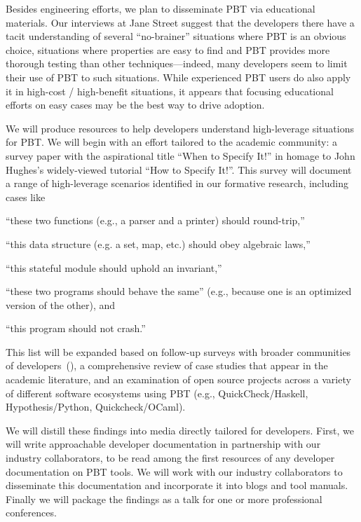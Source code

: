 %
Besides engineering efforts, we plan to disseminate PBT via
educational materials.
Our interviews at Jane Street suggest that the developers there
have a tacit
understanding of several ``no-brainer'' situations where PBT is an obvious
choice, situations where properties are easy to find and PBT provides
more thorough testing than other techniques---indeed, many developers
seem to limit their use of PBT to such situations.
While experienced PBT users do also apply it in
high-cost / high-benefit situations, it appears that
focusing educational efforts on easy cases may be the best way to
drive adoption.

We will produce resources to help developers understand
high-leverage situations for PBT. We will begin with an effort
tailored to the academic community: a survey paper with the
aspirational title ``When to Specify It!'' in homage to John Hughes's
widely-viewed tutorial ``How to Specify It!''. This survey will
document a  range of high-leverage scenarios identified in our formative
research, including cases like
\begin{enumerate*}[label=(\arabic{enumi})]
\item ``these two functions (e.g., a parser and a printer) should round-trip,''
\item ``this data structure (e.g. a set, map, etc.) should obey algebraic laws,''
\item ``this stateful module should uphold an invariant,''
\item ``these two programs should behave the same'' (e.g., because one
is an optimized version of the other),
and
\item ``this program should not crash.''
\end{enumerate*}
This list will be expanded based on follow-up surveys with broader
communities of developers~(), a comprehensive
review of case studies that appear in
the academic literature, and an examination of open source projects across a
variety of different software ecosystems using PBT (e.g.,
QuickCheck/Haskell, Hypothesis/Python, Quickcheck/OCaml).

We will distill these findings
into media directly tailored for developers. First, we will write
approachable developer documentation in partnership with our industry
collaborators, to be read among the first resources of any developer
documentation on PBT tools. We will work with our industry collaborators to
disseminate this documentation and incorporate it into blogs and tool
manuals. Finally we will package the findings as a talk for one or more
professional conferences.

